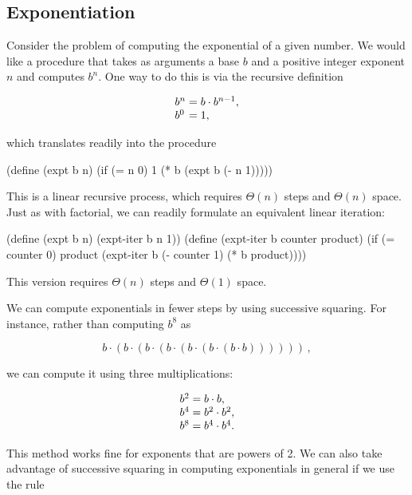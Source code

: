 \subsection{Exponentiation}
\label{Section 1.2.4}

Consider the problem of computing the exponential of a given number.  We would
like a procedure that takes as arguments a base \( b \) and a positive integer
exponent \( n \) and computes \( b^n \).  One way to do this is via the
recursive definition

$$
\begin{array}{l@{{}={}}l}
  b^n & b\cdot b^{n-1}, \\
  b^0 & 1,
\end{array}
$$

\noindent
which translates readily into the procedure

\begin{codeBlock}
(define (expt b n)
  (if (= n 0)
      1
      (* b (expt b (- n 1)))))
\end{codeBlock}

\noindent
This is a linear recursive process, which requires \( \Theta(n) \) steps and
\( \Theta(n) \) space.  Just as with factorial, we can readily formulate an
equivalent linear iteration:

\begin{codeBlock}
(define (expt b n)
  (expt-iter b n 1))
(define (expt-iter b counter product)
  (if (= counter 0)
      product
      (expt-iter b
                 (- counter 1)
                 (* b product))))
\end{codeBlock}

\noindent
This version requires \( \Theta(n) \) steps and \( \Theta(1) \) space.

We can compute exponentials in fewer steps by using successive squaring.  For
instance, rather than computing \( b^8 \) as

$$ b\cdot (b\cdot (b\cdot (b\cdot (b\cdot (b\cdot (b\cdot b))))))\,, $$

\noindent
we can compute it using three multiplications:

$$
\begin{array}{l@{{}={}}l}
  b^2 & b\cdot b, \\
  b^4 & b^2\cdot b^2, \\
  b^8 & b^4\cdot b^4.
\end{array}
$$

This method works fine for exponents that are powers of 2.  We can also take
advantage of successive squaring in computing exponentials in general if we use
the rule

